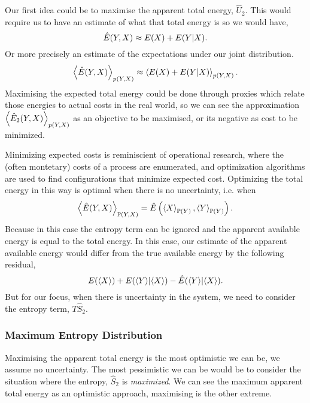 \documentclass[]{article}
\begin{document}
Our first idea could be to maximise the apparent total energy,
\(\hat{U}_2\). This would require us to have an estimate of what that
total energy is so we would have, 
\[
\hat{E}(Y, X)  \approx E(X) + E(Y | X).
\] 
Or more precisely an estimate of the expectations under our joint
distribution. 
\[
\left\langle \hat{E}(Y, X) \right\rangle_{p(Y, X)} \approx \left\langle E(X) + E(Y | X) \right\rangle_{p(Y, X)}.
\] 
Maximising the expected total energy could be done through proxies
which relate those energies to actual costs in the real world, so we can
see the approximation
\(\left\langle \hat{E}_2(Y, X) \right\rangle_{p(Y, X)}\)
as an objective to be maximised, or its negative as cost to be
minimized.

Minimizing expected costs is reminiscient of operational research, where
the (often montetary) costs of a process are enumerated, and
optimization algorithms are used to find configurations that minimize
expected cost. Optimizing the total energy in this way is optimal when
there is no uncertainty, i.e. when 
\[
\left\langle \hat{E}(Y, X) \right\rangle_{\mathbb{P}(Y, X)} =  \hat{E}\left(\left\langle X \right\rangle_{\mathbb{P}(Y)}, \left\langle Y \right\rangle_{\mathbb{P}(Y)}\right) .
\] 
Because in this case the entropy term can be ignored and the apparent
available energy is equal to the total energy. In this case, our
estimate of the apparent available energy would differ from the true
available energy by the following residual, 
\[
E(\langle X\rangle) + E(\langle Y\rangle | \langle X\rangle) - \hat{E}(\langle Y\rangle | \langle X\rangle).
\] But for our focus, when there is uncertainty in the system, we need
to consider the entropy term, \(T\hat{S}_2\).

\subsubsection{Maximum Entropy Distribution}\label{maximum-entropy-distribution}

Maximising the apparent total energy is the most optimistic we can be,
we assume no uncertainty. The most pessimistic we can be would be to
consider the situation where the entropy, \(\hat{S}_2\) is
\emph{maximized}. We can see the maximum apparent total energy as an
optimistic approach, maximising is the other extreme.
\end{document}
